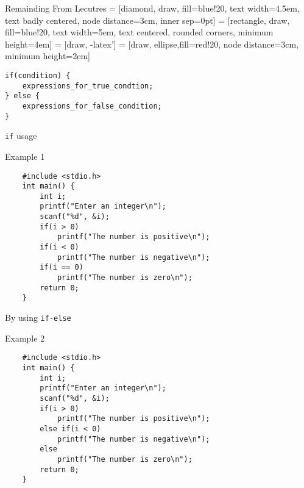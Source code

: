 

\begin{frame}[fragile]{Remainding From Lecutres}
 = [diamond, draw, fill=blue!20, 
    text width=4.5em, text badly centered, node distance=3cm, inner sep=0pt]
 = [rectangle, draw, fill=blue!20, 
    text width=5em, text centered, rounded corners, minimum height=4em]
 = [draw, -latex']
 = [draw, ellipse,fill=red!20, node distance=3cm,
    minimum height=2em]
    
\begin{center}
\begin{lstlisting}
if(condition) {
    expressions_for_true_condtion;
} else {
    expressions_for_false_condition;
}
\end{lstlisting}
\end{center}
\end{frame}

\begin{frame}[fragile]{\texttt{if} usage}
	\begin{exampleblock}{Example 1}
	\begin{lstlisting}
	#include <stdio.h> 
	int main() { 
	    int i;
	    printf("Enter an integer\n");
	    scanf("%d", &i);
	    if(i > 0) 
	        printf("The number is positive\n");
	    if(i < 0)
	        printf("The number is negative\n"); 
	    if(i == 0)
	        printf("The number is zero\n"); 
	    return 0; 
	}
	\end{lstlisting}
	\end{exampleblock}
\end{frame}

\begin{frame}[fragile]{By using \texttt{if-else}}

	\begin{exampleblock}{Example 2}
	\begin{lstlisting}
	#include <stdio.h>
	int main() {
	    int i;
	    printf("Enter an integer\n");
	    scanf("%d", &i); 
	    if(i > 0)
	        printf("The number is positive\n");
	    else if(i < 0)
	        printf("The number is negative\n"); 
	    else
	        printf("The number is zero\n"); 
	    return 0; 
	}
	\end{lstlisting}
	\end{exampleblock}

\end{frame}

